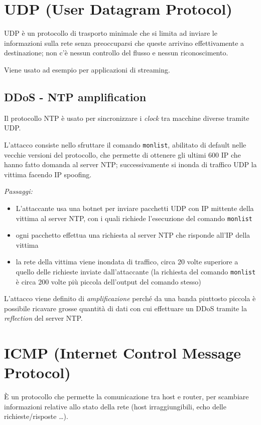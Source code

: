 \section{UDP (User Datagram Protocol)}
UDP è un protocollo di trasporto minimale che si limita ad inviare le informazioni sulla 
rete senza preoccuparsi che queste arrivino effettivamente a destinazione; non c'è nessun 
controllo del flusso e nessun riconoscimento.

\noindent Viene usato ad esempio per applicazioni di streaming.

\subsection{DDoS - NTP amplification}
Il protocollo NTP è usato per sincronizzare i \textit{clock} tra macchine diverse tramite UDP.

\noindent L'attacco consiste nello sfruttare il comando \texttt{monlist}, abilitato di default 
nelle vecchie versioni del protocollo, che permette di ottenere gli ultimi 600 IP che hanno fatto 
domanda al server NTP; successivamente si inonda di traffico UDP la vittima facendo IP spoofing.

\noindent \textit{Passaggi:}
\begin{itemize}
    \item L'attaccante usa una botnet per inviare pacchetti UDP con IP mittente della vittima 
    al server NTP, con i quali richiede l'esecuzione del comando \texttt{monlist}
    \item ogni pacchetto effettua una richiesta al server NTP che risponde all'IP della vittima 
    \item la rete della vittima viene inondata di traffico, circa 20 volte superiore a quello 
    delle richieste inviate dall'attaccante (la richiesta del comando \texttt{monlist} è circa 200 
    volte più piccola dell'output del comando stesso)
\end{itemize}

\noindent L'attacco viene definito di \textit{amplificazione} perché da una banda piuttosto piccola 
è possibile ricavare grosse quantità di dati con cui effettuare un DDoS tramite la \textit{reflection}
del server NTP.

\newpage
\section{ICMP (Internet Control Message Protocol)}
È un protocollo che permette la comunicazione tra host e router, per scambiare informazioni 
relative allo stato della rete (host irraggiungibili, echo delle richieste/risposte \dots).

